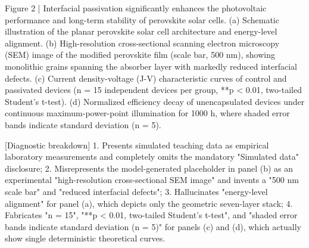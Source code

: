 \begin{Prompt}
Figure 2 | Interfacial passivation significantly enhances the photovoltaic performance and long-term stability of perovskite solar cells. (a) Schematic illustration of the planar perovskite solar cell architecture and energy-level alignment. (b) High-resolution cross-sectional scanning electron microscopy (SEM) image of the modified perovskite film (scale bar, 500 nm), showing monolithic grains spanning the absorber layer with markedly reduced interfacial defects. (c) Current density-voltage (J-V) characteristic curves of control and passivated devices (n = 15 independent devices per group, **p < 0.01, two-tailed Student's t-test). (d) Normalized efficiency decay of unencapsulated devices under continuous maximum-power-point illumination for 1000 h, where shaded error bands indicate standard deviation (n = 5).

[Diagnostic breakdown]
1. Presents simulated teaching data as empirical laboratory measurements and completely omits the mandatory "Simulated data" disclosure;
2. Misrepresents the model-generated placeholder in panel (b) as an experimental "high-resolution cross-sectional SEM image" and invents a "500 nm scale bar" and "reduced interfacial defects";
3. Hallucinates "energy-level alignment" for panel (a), which depicts only the geometric seven-layer stack;
4. Fabricates "n = 15", "**p < 0.01, two-tailed Student's t-test", and "shaded error bands indicate standard deviation (n = 5)" for panels (c) and (d), which actually show single deterministic theoretical curves.
\end{Prompt}

